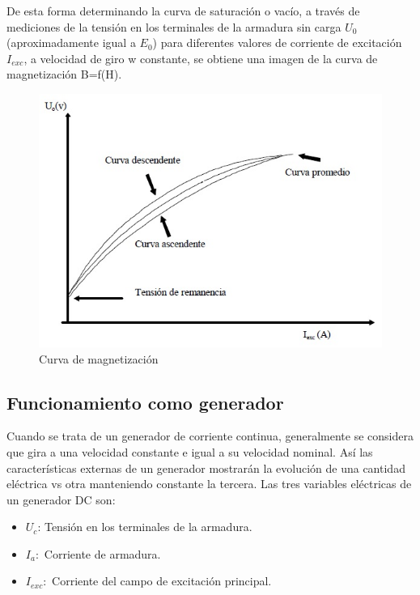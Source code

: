 \documentclass[11pt,letterpaper]{article}     %
\begin{document}
De esta forma determinando la curva de saturación o vacío, a través de
mediciones de la tensión en los terminales de la armadura sin carga $U_{0}$
(aproximadamente igual a $E_{0}$) para diferentes valores de corriente de excitación $I_{exc}$, a velocidad de giro w constante, se obtiene una imagen de la curva de magnetización B=f(H).
\begin{figure}[H]
    \centering
    \includegraphics[scale=0.5]{./recursos-Lab6/curvaDeVacioTeo.jpg}
    \caption{Curva de magnetización}
    \label{fig:curvaDeVacioTeo}
\end{figure}
\subsection{Funcionamiento como generador}
Cuando se trata de un generador de corriente continua, generalmente se
considera que gira a una velocidad constante e igual a su velocidad nominal. Así
las características externas de un generador mostrarán la evolución de una
cantidad eléctrica vs otra manteniendo constante la tercera.
Las tres variables eléctricas de un generador DC son:
\begin{itemize}
    \item $U_{c}$: Tensión en los terminales de la armadura.
    \item $I_{a}:$ Corriente de armadura.
    \item $I_{exc}:$ Corriente del campo de excitación principal.
\end{itemize}
\end{document}
